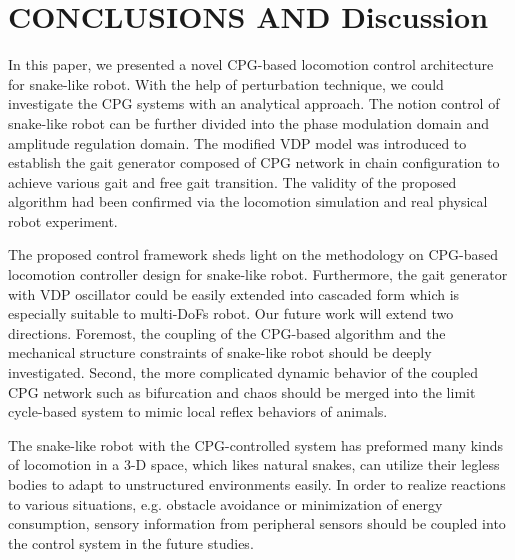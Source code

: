 \documentclass[letterpaper, 10 pt, conference]{ieeeconf}
\begin{document}
\section{CONCLUSIONS AND Discussion}

In this paper, we presented a novel CPG-based locomotion control architecture for snake-like robot. With the help of perturbation technique, we could investigate the CPG systems with an analytical approach. The notion control of snake-like robot can be further divided into the phase modulation domain and amplitude regulation domain. The modified VDP model was introduced to establish the gait generator composed of CPG network in chain configuration to achieve various gait and free gait transition. The validity of the proposed algorithm had been confirmed via the locomotion simulation and real physical robot experiment.

The proposed control framework sheds light on the methodology on CPG-based locomotion controller design for snake-like robot. Furthermore, the gait generator with VDP oscillator could be easily extended into cascaded form which is especially suitable to multi-DoFs robot. Our future work will extend two directions. Foremost, the coupling of the CPG-based algorithm and the mechanical structure constraints of snake-like robot should be deeply investigated. Second, the more complicated dynamic behavior of the coupled CPG network such as bifurcation and chaos should be merged into the limit cycle-based system to mimic local reflex behaviors of animals.

The snake-like robot with the CPG-controlled system has preformed many kinds of locomotion in a 3-D space, which likes natural snakes, can utilize their legless bodies to adapt to unstructured environments easily. In order to realize reactions to various situations, e.g. obstacle avoidance or minimization of energy consumption, sensory information from peripheral sensors should be coupled into the control system in the future studies.




\end{document}
